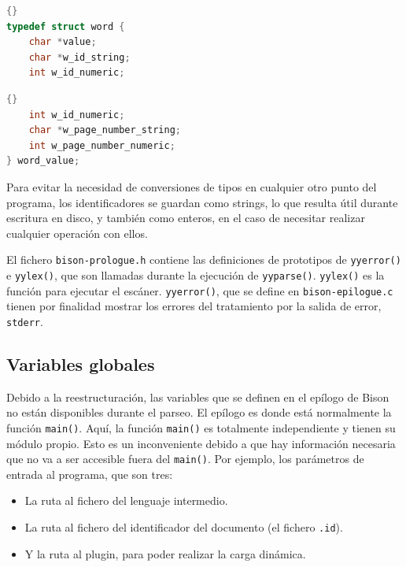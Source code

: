 \noindent\begin{minipage}{.45\textwidth}
    \begin{lstlisting}[language=C,caption={},frame=tlrb,label={}]{}
typedef struct word {
    char *value;
    char *w_id_string;
    int w_id_numeric;
    \end{lstlisting}
\end{minipage}\hfill
\begin{minipage}{.45\textwidth}
    \begin{lstlisting}[language=C,caption={},frame=tlrb,label={}]{}
    int w_id_numeric;
    char *w_page_number_string;
    int w_page_number_numeric;
} word_value;
    \end{lstlisting}
\end{minipage}

Para evitar la necesidad de conversiones de tipos en cualquier otro punto del programa, los identificadores se guardan como strings, lo que resulta útil durante escritura en disco, y también como enteros, en el caso de necesitar realizar cualquier operación con ellos.

El fichero \verb|bison-prologue.h| contiene las definiciones de prototipos de \verb|yyerror()| e \verb|yylex()|, que son llamadas durante la ejecución de \verb|yyparse()|. \verb|yylex()| es la función para ejecutar el escáner. \verb|yyerror()|, que se define en \verb|bison-epilogue.c| tienen por finalidad mostrar los errores del tratamiento por la salida de error, \verb|stderr|.

\subsection{Variables globales}

Debido a la reestructuración, las variables que se definen en el epílogo de Bison no están disponibles durante el parseo. El epílogo es donde está normalmente la función \verb|main()|. Aquí, la función \verb|main()| es totalmente independiente y tienen su módulo propio. Esto es un inconveniente debido a que hay información necesaria que no va a ser accesible fuera del \verb|main()|. Por ejemplo, los parámetros de entrada al programa, que son tres:

\begin{itemize}
    \item La ruta al fichero del lenguaje intermedio.
    \item La ruta al fichero del identificador del documento (el fichero \verb|.id|).
    \item Y la ruta al plugin, para poder realizar la carga dinámica.
\end{itemize}

